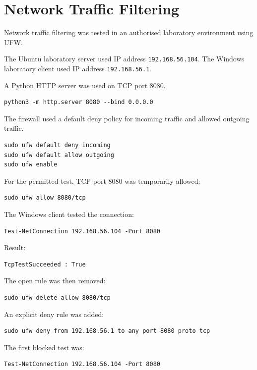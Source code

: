 \documentclass[12pt]{article}
\begin{document}
\section{Network Traffic Filtering}

Network traffic filtering was tested in an authorised laboratory environment using UFW.

The Ubuntu laboratory server used IP address \texttt{192.168.56.104}. The Windows laboratory client used IP address \texttt{192.168.56.1}.

A Python HTTP server was used on TCP port 8080.

\begin{verbatim}
python3 -m http.server 8080 --bind 0.0.0.0
\end{verbatim}

The firewall used a default deny policy for incoming traffic and allowed outgoing traffic.

\begin{verbatim}
sudo ufw default deny incoming
sudo ufw default allow outgoing
sudo ufw enable
\end{verbatim}

For the permitted test, TCP port 8080 was temporarily allowed:

\begin{verbatim}
sudo ufw allow 8080/tcp
\end{verbatim}

The Windows client tested the connection:

\begin{verbatim}
Test-NetConnection 192.168.56.104 -Port 8080
\end{verbatim}

Result:

\begin{verbatim}
TcpTestSucceeded : True
\end{verbatim}

The open rule was then removed:

\begin{verbatim}
sudo ufw delete allow 8080/tcp
\end{verbatim}

An explicit deny rule was added:

\begin{verbatim}
sudo ufw deny from 192.168.56.1 to any port 8080 proto tcp
\end{verbatim}

The first blocked test was:

\begin{verbatim}
Test-NetConnection 192.168.56.104 -Port 8080
\end{verbatim}
\end{document}
